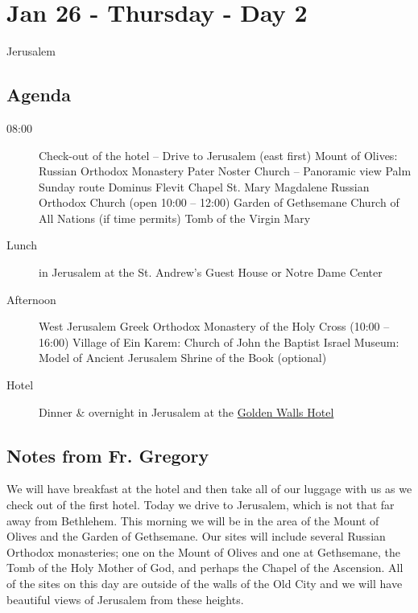 \documentclass[letterpaper]{report}
\begin{document}
\clearpage

\clearpage

\clearpage
\section{Jan 26 - Thursday - Day 2}
Jerusalem
\subsection{Agenda}
\begin{description}
	\item[08:00] Check-out of the hotel – Drive to Jerusalem (east first)
	    \subitem Mount of Olives: Russian Orthodox Monastery
	    \subitem Pater Noster Church -- Panoramic view
	    \subitem Palm Sunday route
	    \subitem Dominus Flevit Chapel
	    \subitem St. Mary Magdalene Russian Orthodox Church
	        (open 10:00 – 12:00)
	    \subitem Garden of Gethsemane
	    \subitem Church of All Nations (if time permits)
	    \subitem Tomb of the Virgin Mary
	\item[Lunch] in Jerusalem at the
			St. Andrew’s Guest House or Notre Dame Center
	\item[Afternoon] West Jerusalem
	    \subitem Greek Orthodox Monastery of the Holy Cross (10:00 – 16:00)
		\subitem Village of Ein Karem: Church of John the Baptist Israel 
		\subitem Museum: Model of Ancient Jerusalem
		\subitem Shrine of the Book (optional)
	\item[Hotel] Dinner \& overnight in Jerusalem at the
	    \href{http://goldenwalls.com/}{Golden Walls Hotel}
\end{description}

\subsection{Notes from Fr. Gregory}
We will have breakfast at the hotel and then take all of our luggage with us 
as we check out of the first hotel.
Today we drive to Jerusalem, which is not that far away from Bethlehem.
This morning we will be in the area of the Mount of Olives and the Garden of
Gethsemane.
Our sites will include several Russian Orthodox monasteries;
one on the Mount of Olives and one at Gethsemane,
the Tomb of the Holy Mother of God,
and perhaps the Chapel of the Ascension.
All of the sites on this day are outside of the walls of the Old City and we
will have beautiful views of Jerusalem from these heights.
\end{document}
